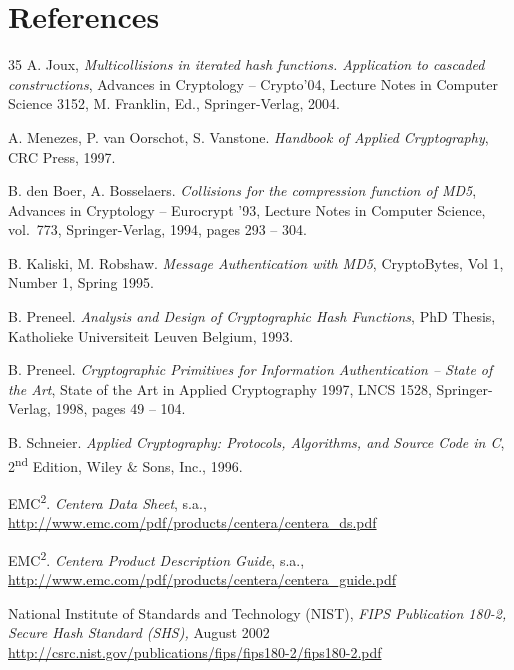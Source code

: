 \section{References}\label{sec:8}
\begingroup
\renewcommand{\section}[2]{}
\begin{thebibliography}{35}
A. Joux, \emph{Multicollisions in iterated hash functions. Application
to cascaded constructions}, Advances in Cryptology -- Crypto'04, Lecture
Notes in Computer Science 3152, M. Franklin, Ed., Springer-Verlag, 2004.

A. Menezes, P. van Oorschot, S. Vanstone. \emph{Handbook of Applied
Cryptography}, CRC Press, 1997.

B. den Boer, A. Bosselaers. \emph{Collisions for the compression
function of MD5}, Advances in Cryptology -- Eurocrypt '93, Lecture Notes
in Computer Science, vol.~773, Springer-Verlag, 1994, pages 293 -- 304.

B. Kaliski, M. Robshaw. \emph{Message Authentication with MD5},
CryptoBytes, Vol 1, Number 1, Spring 1995.

B. Preneel. \emph{Analysis and Design of Cryptographic Hash Functions},
PhD Thesis, Katholieke Universiteit Leuven Belgium, 1993.

B. Preneel. \emph{Cryptographic Primitives for Information
Authentication -- State of the Art}, State of the Art in Applied
Cryptography 1997, LNCS 1528, Springer-Verlag, 1998, pages 49 -- 104.

B. Schneier. \emph{Applied Cryptography: Protocols, Algorithms, and
Source Code in C}, 2\textsuperscript{nd} Edition, Wiley \& Sons, Inc.,
1996.

EMC\textsuperscript{2}. \emph{Centera Data Sheet}, s.a.,
\url{http://www.emc.com/pdf/products/centera/centera_ds.pdf}

EMC\textsuperscript{2}. \emph{Centera Product Description Guide}, s.a.,
\url{http://www.emc.com/pdf/products/centera/centera_guide.pdf}

National Institute of Standards and Technology (NIST), \emph{FIPS
Publication 180-2, Secure Hash Standard (SHS),} August 2002\\
\url{http://csrc.nist.gov/publications/fips/fips180-2/fips180-2.pdf}


\end{thebibliography}
